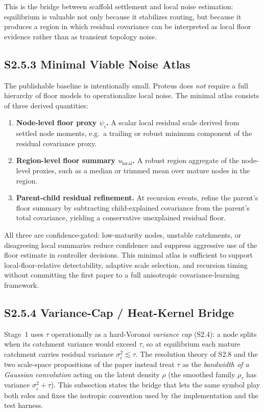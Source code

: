 \documentclass[11pt]{article}
\begin{document}
This is the bridge between scaffold settlement and local noise estimation:
equilibrium is valuable not only because it stabilizes routing, but because it
produces a region in which residual covariance can be interpreted as local floor
evidence rather than as transient topology noise.

\subsection*{S2.5.3 Minimal Viable Noise Atlas}
\label{sec:si-minimal-noise-atlas}
The publishable baseline is intentionally small. Proteus does \emph{not} require
a full hierarchy of floor models to operationalize local noise. The minimal
atlas consists of three derived quantities:
\begin{enumerate}[leftmargin=1.5em]
  \item \textbf{Node-level floor proxy $\psi_i$.} A scalar local residual scale
  derived from settled node moments, e.g.\ a trailing or robust minimum
  component of the residual covariance proxy.
  \item \textbf{Region-level floor summary $u_{\mathrm{local}}$.} A robust region
  aggregate of the node-level proxies, such as a median or trimmed mean over
  mature nodes in the region.
  \item \textbf{Parent-child residual refinement.} At recursion events, refine
  the parent's floor summary by subtracting child-explained covariance from the
  parent's total covariance, yielding a conservative unexplained residual floor.
\end{enumerate}
All three are confidence-gated: low-maturity nodes, unstable catchments, or
disagreeing local summaries reduce confidence and suppress aggressive use of the
floor estimate in controller decisions. This minimal atlas is sufficient to
support local-floor-relative detectability, adaptive scale selection, and
recursion timing without committing the first paper to a full anisotropic
covariance-learning framework.

\subsection*{S2.5.4 Variance-Cap / Heat-Kernel Bridge}
\label{sec:si-tau-heat-bridge}
Stage~1 uses $\tau$ operationally as a hard-Voronoi \emph{variance cap} (S2.4): a
node splits when its catchment variance would exceed $\tau$, so at equilibrium
each mature catchment carries residual variance $\sigma_i^2\lesssim\tau$. The
resolution theory of S2.8 and the two scale-space propositions of the paper
instead treat $\tau$ as the \emph{bandwidth of a Gaussian convolution} acting on
the latent density $\rho$ (the smoothed family $\rho_\tau$ has variance
$\sigma_i^2+\tau$). This subsection states the bridge that lets the same symbol
play both roles and fixes the isotropic convention used by the implementation
and the test harness.
\end{document}
